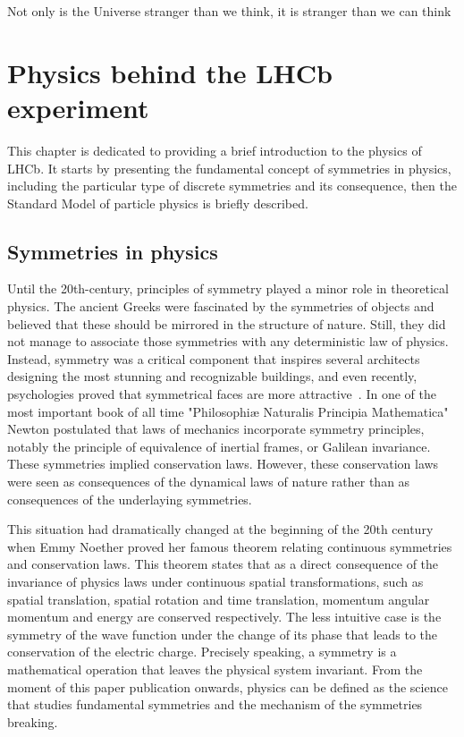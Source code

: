 \begin{savequote}[75mm]
Not only is the Universe stranger than we think, it is stranger than we can think
\end{savequote}

\chapter{Physics behind the LHCb experiment }
\label{chapter:physics}

This chapter is dedicated to providing a brief introduction to the physics of LHCb. It starts by presenting the fundamental concept of symmetries in physics, including the particular type of discrete symmetries and its consequence, then the Standard Model of particle physics is briefly described. 

\section{Symmetries in physics}
Until the 20th-century, principles of symmetry played a minor role in theoretical physics. The ancient Greeks were fascinated by the symmetries of objects and believed that these should be mirrored in the structure of nature. Still, they did not manage to associate those symmetries with any deterministic law of physics. Instead, symmetry was a critical component that inspires several architects designing the most stunning and recognizable buildings, and even recently, psychologies proved that symmetrical faces are more attractive~\cite{faces}. 
In one of the most important book of all time "Philosophiæ Naturalis Principia Mathematica"~\cite{newton} 
Newton postulated that laws of mechanics incorporate symmetry principles, notably the principle of equivalence of inertial frames, or Galilean invariance. These symmetries implied conservation laws. However, these conservation laws were seen as consequences of the dynamical laws of nature rather than as consequences of the underlaying symmetries.  

This situation had dramatically changed at the beginning of the 20th century when Emmy Noether proved her famous theorem relating continuous symmetries and conservation laws.
This theorem states that as a direct consequence of the invariance of physics laws under continuous spatial transformations, such as spatial translation, spatial rotation and time translation, momentum angular momentum and energy are conserved respectively. The less intuitive case is the symmetry of the wave function under the change of its phase that leads to the conservation of the electric charge. Precisely speaking, a symmetry is a mathematical operation that leaves the physical system invariant. 
From the moment of this paper publication onwards, physics can be defined as the science that studies fundamental symmetries and the mechanism of the symmetries breaking.  

